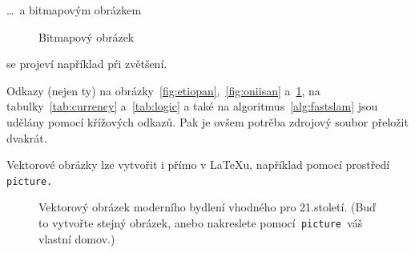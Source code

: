 \documentclass[a4paper, 11pt]{article}
\begin{document}
\bigskip
\noindent\dots~a bitmapovým obrázkem

\begin{figure}[ht]
    \centering
    \caption{Bitmapový obrázek}
    \label{fig:oniisan2}
\end{figure}

\bigskip
\noindent se projeví například pŕi zvětšení.

Odkazy (nejen ty) na obrázky~\ref{fig:etiopan},~\ref{fig:oniisan} a~\ref{fig:oniisan2}, na tabulky~\ref{tab:currency} a~\ref{tab:logic} a také na algoritmus~\ref{alg:fastslam} jsou udělány pomocí křížových odkazů. Pak je ovšem potrěba zdrojový soubor přeložit dvakrát.

Vektorové obrázky lze vytvořit i přímo v \LaTeX u, například pomocí prostředí\verb| picture.|
\pagebreak

\setlength{\unitlength}{1cm}
\setlength{\fboxsep}{0pt}

\begin{landscape}
    \begin{figure}[ht]
        \centering
        \caption{Vektorový obrázek moderního bydlení vhodného pro 21.století. (Buď to vytvořte stejný obrázek, anebo nakreslete pomocí\texttt{ picture }váš vlastní domov.)}
        \label{fig:home}
    \end{figure}
\end{landscape}
\end{document}
